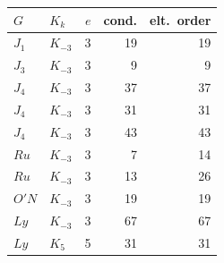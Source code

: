\begin{center}
\normalfont
\begin{tabular}{@{}llrrr@{}}
\toprule
$G$ & $K_k$ & $e$ & cond. & elt.\ order\\
\midrule
$J_1$  & $K_{-3}$ & 3 & 19 & 19\\
$J_3$  & $K_{-3}$ & 3 &  9 &  9\\
$J_4$  & $K_{-3}$ & 3 & 37 & 37\\
$J_4$  & $K_{-3}$ & 3 & 31 & 31\\
$J_4$  & $K_{-3}$ & 3 & 43 & 43\\
$Ru$   & $K_{-3}$ & 3 &  7 & 14\\
$Ru$   & $K_{-3}$ & 3 & 13 & 26\\
$O'N$  & $K_{-3}$ & 3 & 19 & 19\\
$Ly$   & $K_{-3}$ & 3 & 67 & 67\\
$Ly$   & $K_5$    & 5 & 31 & 31\\
\bottomrule
\end{tabular}
\end{center}
